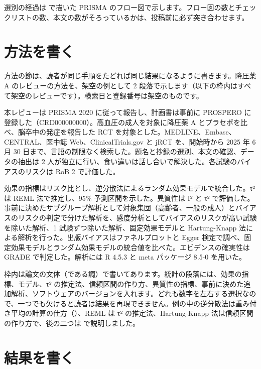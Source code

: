 選別の経過は  で描いた PRISMA のフロー図で示します。フロー図の数とチェックリストの数、本文の数がそろっているかは、投稿前に必ず突き合わせます。

\section{方法を書く}
\label{sec:08-2}

方法の節は、読者が同じ手順をたどれば同じ結果になるように書きます。降圧薬 A のレビューの方法を、架空の例として 2 段落で示します（以下の枠内はすべて架空のレビューです）。検索日と登録番号は架空のものです。

\begin{KKfbox9ao}[方法の例]
本レビューは PRISMA 2020 に従って報告し、計画書は事前に PROSPERO に登録した（CRD000000000）。高血圧の成人を対象に降圧薬 A とプラセボを比べ、脳卒中の発症を報告した RCT を対象とした。MEDLINE、Embase、CENTRAL、医中誌 Web、ClinicalTrials.gov と jRCT を、開始時から 2025 年 6 月 30 日まで、言語の制限なく検索した。題名と抄録の選別、本文の確認、データの抽出は 2 人が独立に行い、食い違いは話し合いで解決した。各試験のバイアスのリスクは RoB 2 で評価した。

効果の指標はリスク比とし、逆分散法によるランダム効果モデルで統合した。τ² は REML 法で推定し、95\% 予測区間を示した。異質性は I² と τ² で評価した。事前に決めたサブグループ解析として対象集団（高齢者、一般の成人）とバイアスのリスクの判定で分けた解析を、感度分析としてバイアスのリスクが高い試験を除いた解析、1 試験ずつ除いた解析、固定効果モデルと Hartung-Knapp 法による解析を行った。出版バイアスはファネルプロットと Egger 検定で調べ、固定効果モデルとランダム効果モデルの統合値を比べた。エビデンスの確実性は GRADE で判定した。解析には R 4.5.3 と meta パッケージ 8.5-0 を用いた。
\end{KKfbox9ao}

枠内は論文の文体（である調）で書いてあります。統計の段落には、効果の指標、モデル、τ² の推定法、信頼区間の作り方、異質性の指標、事前に決めた追加解析、ソフトウェアのバージョンを入れます。どれも数字を左右する選択なので、一つでも欠けると読者は結果を再現できません。例の中の逆分散法は重み付き平均の計算の仕方（）、REML は τ² の推定法、Hartung-Knapp 法は信頼区間の作り方で、後の二つは  で説明しました。

\section{結果を書く}
\label{sec:08-3}

